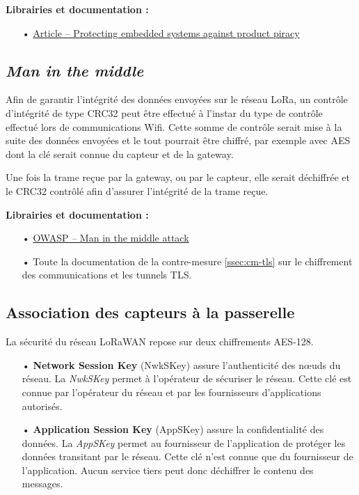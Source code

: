 \documentclass[12pt]{article}
\begin{document}
\medskip
\textbf{Librairies et documentation :}

\begin{itemize}
\item[•] \href{https://www.aisec.fraunhofer.de/content/dam/aisec/Dokumente/Publikationen/Studien_TechReports/englisch/Whitepaper_ProductProtection.pdf}{Article -- Protecting embedded systems against product piracy}
\end{itemize}

\subsection{\emph{Man in the middle}}
\label{ssec:cm-mitm}

Afin de garantir l'intégrité des données envoyées sur le réseau LoRa, un contrôle d'intégrité de type CRC32 peut être effectué à l'instar du type de contrôle effectué lors de communications Wifi. Cette somme de contrôle serait mise à la suite des données envoyées et le tout pourrait être chiffré, par exemple avec AES dont la clé serait connue du capteur et de la gateway.

Une fois la trame reçue par la gateway, ou par le capteur, elle serait déchiffrée et le CRC32 contrôlé afin d'assurer l'intégrité de la trame reçue.

\medskip
\textbf{Librairies et documentation :}

\begin{itemize}
\item[•] \href{https://www.owasp.org/index.php/Man-in-the-middle_attack}{OWASP -- Man in the middle attack}
\item[•] Toute la documentation de la contre-mesure \ref{ssec:cm-tls} sur le chiffrement des communications et les tunnels TLS.
\end{itemize}

\subsection{Association des capteurs à la passerelle}
\label{ssec:cm-association}

La sécurité du réseau LoRaWAN repose sur deux chiffrements AES-128.

\begin{itemize}
\item[•] \textbf{Network Session Key} (NwkSKey) assure l'authenticité des nœuds du réseau. La \emph{NwkSKey} permet à l'opérateur de sécuriser le réseau. Cette clé est connue par l'opérateur du réseau et par les fournisseurs d'applications autorisés.
\item[•] \textbf{Application Session Key} (AppSKey) assure la confidentialité des données. La \emph{AppSKey} permet au fournisseur de l'application de protéger les données transitant par le réseau. Cette clé n'est connue que du fournisseur de l'application. Aucun service tiers peut donc déchiffrer le contenu des messages.
\end{itemize}
\end{document}

